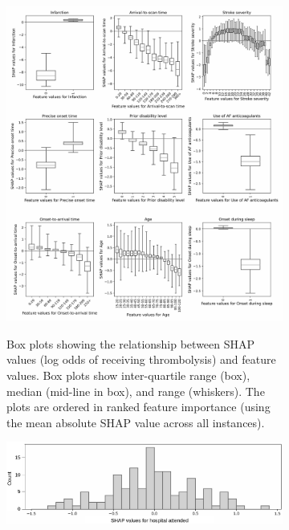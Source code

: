 \begin{figure}
    \centering
    \begin{subfigure}{0.8\textwidth}
      \centering
      \captionsetup{width=.9\linewidth}
      \includegraphics[trim={0 0 0 1.2cm}, clip, width=0.95\linewidth]      {images/p2_patient_shap.jpg}\\
        \caption{Box plots showing the relationship between SHAP values  (log odds of receiving thrombolysis) and feature values. Box plots show inter-quartile range (box), median (mid-line in box), and range (whiskers). The plots are ordered in ranked feature importance (using the mean absolute SHAP value across all instances).}
        \label{fig:global_shap}
    \end{subfigure}
    \hfill
    \begin{subfigure}{0.8\textwidth}
      \centering
      \captionsetup{width=.9\linewidth}
      \includegraphics[trim={0 0 0 0.1cm}, clip, width=1\linewidth]    {images/p2_hosp_shap.jpg}

\end{subfigure}
\end{figure}
